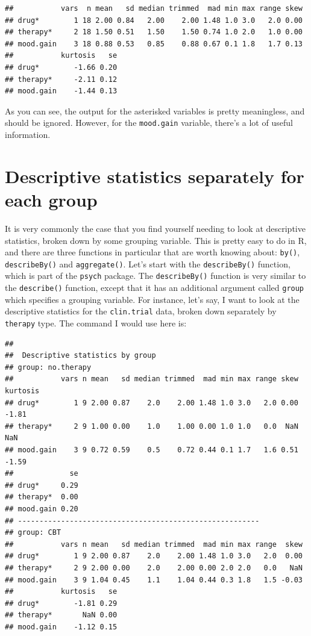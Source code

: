 \documentclass[
]{book}
\newenvironment{Shaded}{\begin{snugshade}}{\end{snugshade}}
\newcommand{\AttributeTok}[1]{\textcolor[rgb]{0.77,0.63,0.00}{#1}}
\newcommand{\FunctionTok}[1]{\textcolor[rgb]{0.00,0.00,0.00}{#1}}
\newcommand{\NormalTok}[1]{#1}
\newcommand{\SpecialCharTok}[1]{\textcolor[rgb]{0.00,0.00,0.00}{#1}}
\begin{document}
\begin{verbatim}
##           vars  n mean   sd median trimmed  mad min max range skew
## drug*        1 18 2.00 0.84   2.00    2.00 1.48 1.0 3.0   2.0 0.00
## therapy*     2 18 1.50 0.51   1.50    1.50 0.74 1.0 2.0   1.0 0.00
## mood.gain    3 18 0.88 0.53   0.85    0.88 0.67 0.1 1.8   1.7 0.13
##           kurtosis   se
## drug*        -1.66 0.20
## therapy*     -2.11 0.12
## mood.gain    -1.44 0.13
\end{verbatim}

As you can see, the output for the asterisked variables is pretty meaningless, and should be ignored. However, for the \texttt{mood.gain} variable, there's a lot of useful information.

\hypertarget{groupdescriptives}{%
\section{Descriptive statistics separately for each group}\label{groupdescriptives}}

It is very commonly the case that you find yourself needing to look at descriptive statistics, broken down by some grouping variable. This is pretty easy to do in R, and there are three functions in particular that are worth knowing about: \texttt{by()}, \texttt{describeBy()} and \texttt{aggregate()}. Let's start with the \texttt{describeBy()} function, which is part of the \texttt{psych} package. The \texttt{describeBy()} function is very similar to the \texttt{describe()} function, except that it has an additional argument called \texttt{group} which specifies a grouping variable. For instance, let's say, I want to look at the descriptive statistics for the \texttt{clin.trial} data, broken down separately by \texttt{therapy} type. The command I would use here is:

\begin{Shaded}
\end{Shaded}

\begin{verbatim}
## 
##  Descriptive statistics by group 
## group: no.therapy
##           vars n mean   sd median trimmed  mad min max range skew kurtosis
## drug*        1 9 2.00 0.87    2.0    2.00 1.48 1.0 3.0   2.0 0.00    -1.81
## therapy*     2 9 1.00 0.00    1.0    1.00 0.00 1.0 1.0   0.0  NaN      NaN
## mood.gain    3 9 0.72 0.59    0.5    0.72 0.44 0.1 1.7   1.6 0.51    -1.59
##             se
## drug*     0.29
## therapy*  0.00
## mood.gain 0.20
## -------------------------------------------------------- 
## group: CBT
##           vars n mean   sd median trimmed  mad min max range  skew
## drug*        1 9 2.00 0.87    2.0    2.00 1.48 1.0 3.0   2.0  0.00
## therapy*     2 9 2.00 0.00    2.0    2.00 0.00 2.0 2.0   0.0   NaN
## mood.gain    3 9 1.04 0.45    1.1    1.04 0.44 0.3 1.8   1.5 -0.03
##           kurtosis   se
## drug*        -1.81 0.29
## therapy*       NaN 0.00
## mood.gain    -1.12 0.15
\end{verbatim}
\end{document}
